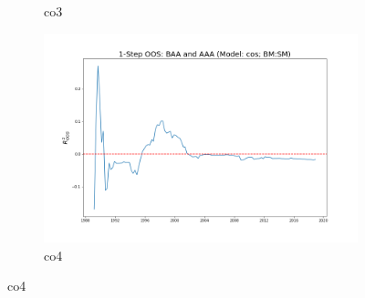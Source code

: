 \documentclass[a4paper,12pt,times,numbered,print,index]{report}
\numberwithin{equation}{section}
\begin{document}
\begin{figure}[!htbp]
\begin{subfigure}[b]{0.42\linewidth}
			\caption{co3}
		\end{subfigure}
		\begin{subfigure}[b]{0.42\linewidth}
			\includegraphics[width=0.9\linewidth]{OOS_plots/cos_co4_SM.png}
			\caption{co4}
		\end{subfigure}
		\label{g2}
	\end{figure}
	
\end{document}

